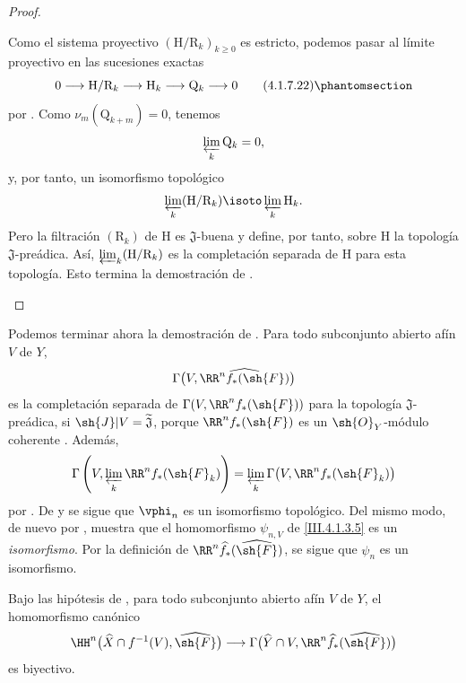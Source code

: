 \documentclass[oneside]{amsart}
\renewcommand{\geq}{\geqslant}
\let\EGAOriginalLabel\label
\renewcommand{\label}[1]{\phantomsection\EGAOriginalLabel{#1}}
\begin{document}
\begin{proof}
\begin{env}[4.1.7.21]
Como el sistema proyectivo
$(\mathrm{H}/\mathrm{R}_k)_{k\geq0}$ es estricto, podemos pasar al
límite proyectivo en las sucesiones exactas
\[
  0
  \longrightarrow
  \mathrm{H}/\mathrm{R}_k
  \longrightarrow
  \mathrm{H}_k
  \longrightarrow
  \mathrm{Q}_k
  \longrightarrow
  0
  \tag{4.1.7.22}
  \label{III.4.1.7.22}
\]
por .
Como $\nu_m(\mathrm{Q}_{k+m})=0$, tenemos
\[
  \varprojlim_k\mathrm{Q}_k=0,
\]
y, por tanto, un isomorfismo topológico
\[
  \varprojlim_k(\mathrm{H}/\mathrm{R}_k)
  \isoto
  \varprojlim_k\mathrm{H}_k.
\]
Pero la filtración $(\mathrm{R}_k)$ de $\mathrm{H}$ es
$\mathfrak{J}$-buena y define, por tanto, sobre $\mathrm{H}$ la
topología $\mathfrak{J}$-preádica.
Así, $\varprojlim_k(\mathrm{H}/\mathrm{R}_k)$ es la completación
separada de $\mathrm{H}$ para esta topología.
Esto termina la demostración de .
\end{env}
\end{proof}

\begin{env}[4.1.8]
\label{III.4.1.8}
Podemos terminar ahora la demostración de .
Para todo subconjunto abierto afín $V$ de $Y$,
\[
  \Gamma\bigl(
    V,\widehat{\RR^n f_*(\sh{F})}
  \bigr)
\]
es la completación separada de
$\Gamma(V,\RR^n f_*(\sh{F}))$ para la topología
$\mathfrak{J}$-preádica, si
$\sh{J}|V=\widetilde{\mathfrak{J}}$, porque
$\RR^n f_*(\sh{F})$ es un $\sh{O}_Y$-módulo coherente
.
Además,
\[
  \Gamma\left(
    V,\varprojlim_k\RR^n f_*(\sh{F}_k)
  \right)
  =
  \varprojlim_k
  \Gamma\bigl(V,\RR^n f_*(\sh{F}_k)\bigr)
\]
por .
De  y  se sigue que
$\vphi_n$ es un isomorfismo topológico.
Del mismo modo, de nuevo por , 
muestra que el homomorfismo $\psi_{n,V}$ de \eqref{III.4.1.3.5} es un
\emph{isomorfismo}.
Por la definición de
$\RR^n\widehat{f}_*(\widehat{\sh{F}})$, se sigue que $\psi_n$ es un
isomorfismo.
\end{env}

\begin{corollary}[4.1.9]
\label{III.4.1.9}
Bajo las hipótesis de , para todo subconjunto abierto
afín $V$ de $Y$, el homomorfismo canónico
\[
  \HH^n\bigl(
    \widehat{X}\cap f^{-1}(V),
    \widehat{\sh{F}}
  \bigr)
  \longrightarrow
  \Gamma\bigl(
    \widehat{Y}\cap V,
    \RR^n\widehat{f}_*(\widehat{\sh{F}})
  \bigr)
\]
es biyectivo.
\end{corollary}
\end{document}
